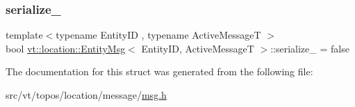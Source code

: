 \subsubsection{\texorpdfstring{serialize\+\_\+}{serialize\_}}
{\footnotesize\ttfamily template$<$typename Entity\+ID , typename Active\+MessageT $>$ \\
bool \hyperlink{structvt_1_1location_1_1_entity_msg}{vt\+::location\+::\+Entity\+Msg}$<$ Entity\+ID, Active\+MessageT $>$\+::serialize\+\_\+ = false\hspace{0.3cm}{\ttfamily [private]}}



The documentation for this struct was generated from the following file\+:\begin{DoxyCompactItemize}
\item 
src/vt/topos/location/message/\hyperlink{msg_8h}{msg.\+h}\end{DoxyCompactItemize}
